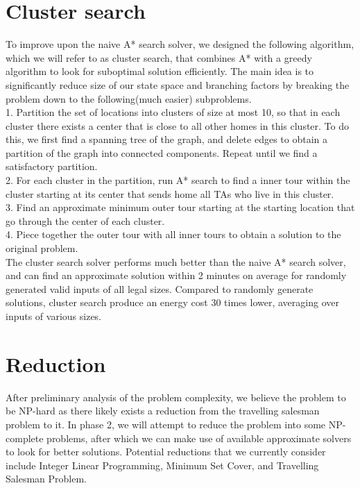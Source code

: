 \documentclass{article}
\begin{document}
\section{Cluster search}
To improve upon the naive A* search solver, we designed the following algorithm, which we will refer to as cluster search, that combines A* with a greedy algorithm to look for suboptimal solution efficiently. The main idea is to significantly reduce size of our state space and branching factors by breaking the problem down to the following(much easier) subproblems.\\
1. Partition the set of locations into clusters of size at most 10, so that in each cluster there exists a center that is close to all other homes in this cluster. To do this, we first find a spanning tree of the graph, and delete edges to obtain a partition of the graph into connected components. Repeat until we find a satisfactory partition.\\
2. For each cluster in the partition, run A* search to find a inner tour within the cluster starting at its center that sends home all TAs who live in this cluster.\\
3. Find an approximate minimum outer tour starting at the starting location that go through the center of each cluster.\\
4. Piece together the outer tour with all inner tours to obtain a solution to the original problem.\\
The cluster search solver performs much better than the naive A* search solver, and can find an approximate solution within 2 minutes on average for randomly generated valid inputs of all legal sizes. Compared to randomly generate solutions, cluster search produce an energy cost 30 times lower, averaging over inputs of  various sizes.
\section{Reduction}
After preliminary analysis of the problem complexity, we believe the problem to be NP-hard as there likely exists a reduction from the travelling salesman problem to it. In phase 2, we will attempt to reduce the problem into some NP-complete problems, after which we can make use of available approximate solvers to look for better solutions. Potential reductions that we currently consider include Integer Linear Programming, Minimum Set Cover, and Travelling Salesman Problem.
\end{document}
